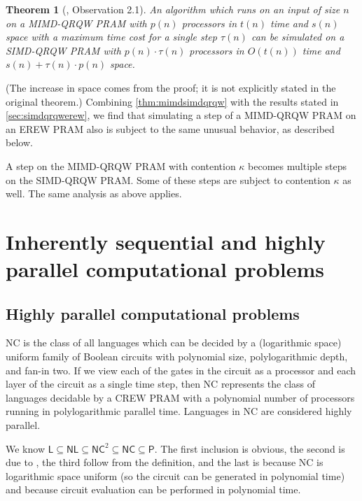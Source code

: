 \documentclass{article}
\newtheorem{theorem}{Theorem}
\begin{document}
\begin{theorem}[\cite{gmr98a}, Observation 2.1]\label{thm:mimdsimdqrqw}
  An algorithm which runs on an input of size $n$ on a MIMD-QRQW PRAM with $p(n)$ processors in $t(n)$ time and $s(n)$ space with a maximum time cost for a single step $\tau(n)$ can be simulated on a SIMD-QRQW PRAM with $p(n)\cdot \tau(n)$ processors in $O(t(n))$ time and $s(n) + \tau(n) \cdot p(n)$ space.
\end{theorem}

(The increase in space comes from the proof; it is not explicitly stated in the original theorem.)
Combining \autoref{thm:mimdsimdqrqw} with the results stated in \autoref{sec:simdqrqwerew}, we find that simulating a step of a MIMD-QRQW PRAM on an EREW PRAM also is subject to the same unusual behavior, as described below.

A step on the MIMD-QRQW PRAM with contention $\kappa$ becomes multiple steps on the SIMD-QRQW PRAM.
Some of these steps are subject to contention $\kappa$ as well.
The same analysis as above applies.

\section{Inherently sequential and highly parallel computational problems}

\subsection{Highly parallel computational problems}\label{sec:definenc}

\textsf{NC} is the class of all languages which can be decided by a (logarithmic space) uniform family of Boolean circuits with polynomial size, polylogarithmic depth, and fan-in two.
If we view each of the gates in the circuit as a processor and each layer of the circuit as a single time step, then \textsf{NC} represents the class of languages decidable by a CREW PRAM with a polynomial number of processors running in polylogarithmic parallel time.
Languages in \textsf{NC} are considered highly parallel.

We know $\mathsf{L}\subseteq\mathsf{NL}\subseteq\mathsf{NC}^2\subseteq\mathsf{NC}\subseteq\mathsf{P}$.
The first inclusion is obvious, the second is due to \cite{borodin77}, the third follow from the definition, and the last is because \textsf{NC} is logarithmic space uniform (so the circuit can be generated in polynomial time) and because circuit evaluation can be performed in polynomial time.
\end{document}
